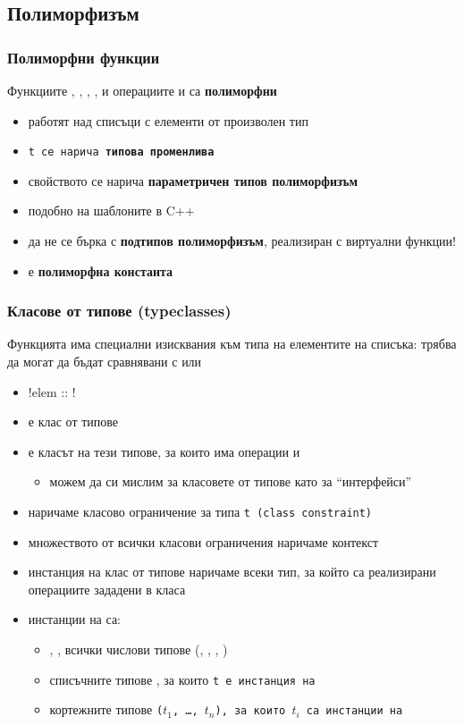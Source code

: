 \documentclass[alsotrans]{beamerswitch}
\begin{document}
\subsection{Полиморфизъм}

\begin{frame}
  \frametitle{Полиморфни функции}

  Функциите , , , ,  и операциите \lst{++} и \lst{!!} са \textbf{полиморфни}
  \begin{itemize}[<+->]
  \item работят над списъци с елементи от произволен тип \lst{[t]}
  \item \tt t се нарича \textbf{типова променлива}
  \item свойството се нарича \textbf{параметричен типов полиморфизъм}
  \item подобно на шаблоните в C++
  \item \alert{да не се бърка с \textbf{подтипов полиморфизъм}, реализиран с виртуални функции!}
  \item \lst{[]} е \textbf{полиморфна константа}
  \end{itemize}
\end{frame}

\begin{frame}[fragile]
  \frametitle{Класове от типове (typeclasses)}

  Функцията  има специални изисквания към типа на елементите на списъка: трябва да могат да бъдат сравнявани с \lst{==} или \lst{/=}
  \begin{itemize}[<+->]
  \item \lst!elem :: !
  \item {} е \alert{клас от типове}
  \item {} е класът на тези типове, за които има операции \lst{==} и \lst{/=}
    \begin{itemize}
    \item можем да си мислим за класовете от типове като за ``интерфейси''
    \end{itemize}
  \item {} наричаме \alert{класово ограничение} за типа \tt t (class constraint)
  \item множеството от всички класови ограничения наричаме \alert{контекст}
  \item \alert{инстанция} на клас от типове наричаме всеки тип, за който са реализирани операциите зададени в класа
  \item инстанции на  са:
    \begin{itemize}
    \item {}, , всички числови типове (, , , )
    \item списъчните типове \lst{[t]}, за които \tt t е инстанция на 
    \item кортежните типове \tt($t_1$\tt, \ldots\tt, $t_n$\tt), за които $t_i$ са инстанции на 
    \end{itemize}
  \end{itemize}
\end{frame}
\end{document}
